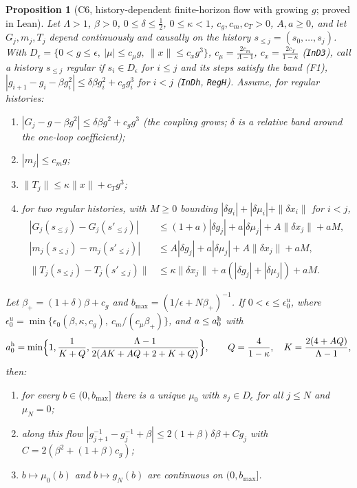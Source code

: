 \documentclass[11pt]{amsart}
\newtheorem{proposition}[theorem]{Proposition}
\theoremstyle{definition}
\theoremstyle{remark}
\numberwithin{equation}{section}
\begin{document}
\begin{proposition}[C6, history-dependent finite-horizon flow with growing $g$; proved in Lean]\label{prop:C6}
Let $\Lambda>1$, $\beta>0$, $0\le\delta\le\frac12$, $0\le\kappa<1$, $c_g,c_m,c_T>0$, $A,a\ge0$, and let
$G_j,m_j,T_j$ depend continuously and causally on the history $s_{\le j}=(s_0,\dots,s_j)$. With
$D_\epsilon=\{0<g\le\epsilon,\ |\mu|\le c_\mu g,\ \|x\|\le c_xg^3\}$, $c_\mu=\frac{2c_m}{\Lambda-1}$,
$c_x=\frac{2c_T}{1-\kappa}$ (\texttt{InD3}), call a history $s_{\le j}$ \emph{regular} if
$s_i\in D_\epsilon$ for $i\le j$ and its steps satisfy the band (F1),
$|g_{i+1}-g_i-\beta g_i^2|\le\delta\beta g_i^2+c_gg_i^3$ for $i<j$ (\texttt{InDh}, \texttt{RegH}). Assume,
for regular histories:
\begin{enumerate}
\item[(F1)] $|G_j-g-\beta g^2|\le\delta\beta g^2+c_gg^3$ (the coupling \emph{grows}; $\delta$ is a
  relative band around the one-loop coefficient);
\item[(F2)] $|m_j|\le c_mg$;
\item[(F3)] $\|T_j\|\le\kappa\|x\|+c_Tg^3$;
\item[(L)] for two regular histories, with $M\ge0$ bounding $|\delta g_i|+|\delta\mu_i|+\|\delta x_i\|$
  for $i<j$,
  \begin{align*}
    |G_j(s_{\le j})-G_j(s'_{\le j})|&\le(1+a)|\delta g_j|+a|\delta\mu_j|+A\|\delta x_j\|+aM,\\
    |m_j(s_{\le j})-m_j(s'_{\le j})|&\le A|\delta g_j|+a|\delta\mu_j|+A\|\delta x_j\|+aM,\\
    \|T_j(s_{\le j})-T_j(s'_{\le j})\|&\le\kappa\|\delta x_j\|+a(|\delta g_j|+|\delta\mu_j|)+aM.
  \end{align*}
\end{enumerate}
Let $\beta_+=(1+\delta)\beta+c_g$ and $b_{\max}=(1/\epsilon+N\beta_+)^{-1}$. If $0<\epsilon\le\epsilon_0^u$,
where $\epsilon_0^u=\min\{\epsilon_0(\beta,\kappa,c_g),\ c_m/(c_\mu\beta_+)\}$, and $a\le a_0^{\rm h}$ with
\[
  a_0^{\rm h}=\min\Bigl\{1,\frac1{K+Q},\frac{\Lambda-1}{2(AK+AQ+2+K+Q)}\Bigr\},\qquad
  Q=\frac4{1-\kappa},\quad K=\frac{2(4+AQ)}{\Lambda-1},
\]
then:
\begin{enumerate}
\item[(i)] for every $b\in(0,b_{\max}]$ there is a unique $\mu_0$ with $s_j\in D_\epsilon$ for all $j\le N$
  and $\mu_N=0$;
\item[(ii)] along this flow $|g_{j+1}^{-1}-g_j^{-1}+\beta|\le2(1+\beta)\delta\beta+C g_j$ with
  $C=2(\beta^2+(1+\beta)c_g)$;
\item[(iii)] $b\mapsto\mu_0(b)$ and $b\mapsto g_N(b)$ are continuous on $(0,b_{\max}]$.
\end{enumerate}
\end{proposition}
\end{document}
